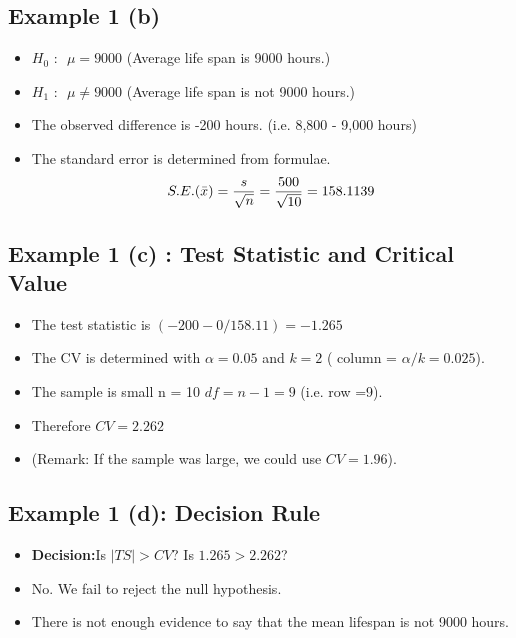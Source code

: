 \begin{frame}
\subsection*{Example 1 (b) }
\large
\begin{itemize}
\item $H_0 \mbox{ : } $ $\mu = 9000$ (Average life span is 9000 hours.)
\item $H_1 \mbox{ : } $ $\mu \neq 9000$ (Average life span is not 9000 hours.)
\end{itemize}
\bigskip
\begin{itemize}
\item The observed difference is -200 hours. (i.e. 8,800 - 9,000 hours)
\item The standard error is determined from formulae.
\[ S.E. (\bar{x}) = {s \over \sqrt{n}} = {500 \over \sqrt{10}}  = 158.1139 \]
\end{itemize}
\end{frame}
\begin{frame}[fragile]
\subsection*{Example 1 (c) : Test Statistic and Critical Value }
\large
\begin{itemize}
\item The test statistic is $(-200 -0 /  158.11) = -1.265$
\item The CV is determined with $\alpha = 0.05$ and $k = 2$ ( column = $\alpha/k=0.025$).
\item The sample is small n = 10 $df = n-1 = 9$ (i.e. row =9).
\item Therefore $CV = 2.262$

\item (Remark: If the sample was large, we could use $CV = 1.96$).

\end{itemize}
\end{frame}

\begin{frame}
\subsection*{Example 1 (d): Decision Rule }
\large
\begin{itemize}
\item \textbf{Decision:}Is $|TS| >CV$? Is $1.265 > 2.262$?
\item No. We fail to reject the null hypothesis. \item There is not enough evidence to say that the mean lifespan is not 9000 hours.
\end{itemize}
\end{frame}
